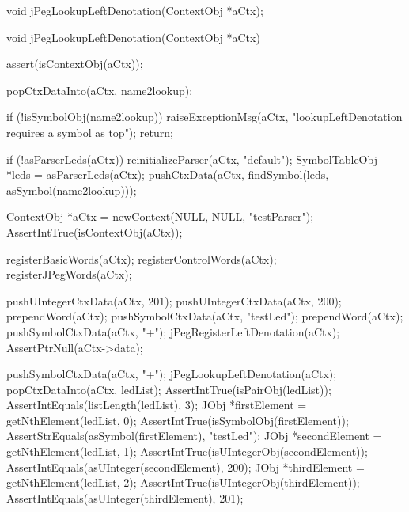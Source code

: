 \startCHeader
void jPegLookupLeftDenotation(ContextObj *aCtx);
\stopCHeader

\startCCode
void jPegLookupLeftDenotation(ContextObj *aCtx) {
  assert(isContextObj(aCtx));

  popCtxDataInto(aCtx, name2lookup);

  if (!isSymbolObj(name2lookup)) {
    raiseExceptionMsg(aCtx,
      "lookupLeftDenotation requires a symbol as top");
    return;
  }

  if (!asParserLeds(aCtx)) reinitializeParser(aCtx, "default");
  SymbolTableObj *leds = asParserLeds(aCtx);
  pushCtxData(aCtx, findSymbol(leds, asSymbol(name2lookup)));
}
\stopCCode


\startCTest
  ContextObj *aCtx = newContext(NULL, NULL, "testParser");
  AssertIntTrue(isContextObj(aCtx));
  
  registerBasicWords(aCtx);
  registerControlWords(aCtx);
  registerJPegWords(aCtx);
  
  pushUIntegerCtxData(aCtx, 201);
  pushUIntegerCtxData(aCtx, 200);
  prependWord(aCtx);
  pushSymbolCtxData(aCtx, "testLed");
  prependWord(aCtx);
  pushSymbolCtxData(aCtx, "+");
  jPegRegisterLeftDenotation(aCtx);
  AssertPtrNull(aCtx->data);
  
  pushSymbolCtxData(aCtx, "+");
  jPegLookupLeftDenotation(aCtx);
  popCtxDataInto(aCtx, ledList);
  AssertIntTrue(isPairObj(ledList));
  AssertIntEquals(listLength(ledList), 3);
  JObj *firstElement = getNthElement(ledList, 0);
  AssertIntTrue(isSymbolObj(firstElement));
  AssertStrEquals(asSymbol(firstElement), "testLed");
  JObj *secondElement = getNthElement(ledList, 1);
  AssertIntTrue(isUIntegerObj(secondElement));
  AssertIntEquals(asUInteger(secondElement), 200);
  JObj *thirdElement = getNthElement(ledList, 2);
  AssertIntTrue(isUIntegerObj(thirdElement));
  AssertIntEquals(asUInteger(thirdElement), 201);
\stopCTest
\stopTestCase
\stopTestSuite

